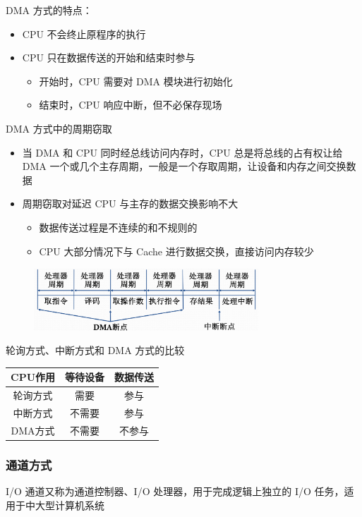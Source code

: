 \documentclass[cs4size,a4paper,10pt]{ctexart}
\begin{document}
	DMA 方式的特点：
	\begin{itemize}
		\item CPU 不会终止原程序的执行
		\item CPU 只在数据传送的开始和结束时参与
		\begin{itemize}
			\item 开始时，CPU 需要对 DMA 模块进行初始化
			\item 结束时，CPU 响应中断，但不必保存现场
		\end{itemize}
	\end{itemize}

	DMA 方式中的周期窃取
	\begin{itemize}
		\item 当 DMA 和 CPU 同时经总线访问内存时，CPU 总是将总线的占有权让给 DMA 一个或几个主存周期，一般是一个存取周期，让设备和内存之间交换数据
		\item 周期窃取对延迟 CPU 与主存的数据交换影响不大
		\begin{itemize}
			\item 数据传送过程是不连续的和不规则的
			\item CPU 大部分情况下与 Cache 进行数据交换，直接访问内存较少
		\end{itemize}
	\end{itemize}
	\begin{figure}[H]
		\centering
		\includegraphics[width=0.75\textwidth]{img/4.1.2.5.2}
	\end{figure}
	轮询方式、中断方式和 DMA 方式的比较
	\begin{table}[H]
		\centering
		\begin{tabular}{|c|c|c|}
		\hline
		CPU作用 & 等待设备 & 数据传送 \\ \hline
		轮询方式  & 需要   & 参与   \\ \hline
		中断方式  & 不需要  & 参与   \\ \hline
		DMA方式 & 不需要  & 不参与  \\ \hline
		\end{tabular}
	\end{table}

	\subsubsection{通道方式}
	I/O 通道又称为通道控制器、I/O 处理器，用于完成逻辑上独立的 I/O 任务，适用于中大型计算机系统
\end{document}
